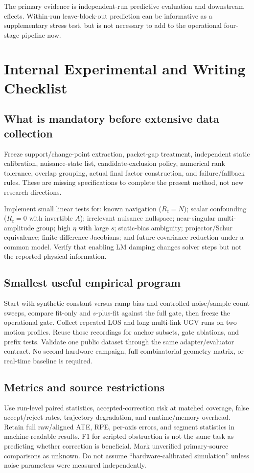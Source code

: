 \documentclass[conference]{IEEEtran}%
\begin{document}
The primary evidence is independent-run predictive evaluation and downstream effects. Within-run leave-block-out prediction can be informative as a supplementary stress test, but is not necessary to add to the operational four-stage pipeline now.

\section{Internal Experimental and Writing Checklist}
\subsection{What is mandatory before extensive data collection}
Freeze support/change-point extraction, packet-gap treatment, independent static calibration, nuisance-state list, candidate-exclusion policy, numerical rank tolerance, overlap grouping, actual final factor construction, and failure/fallback rules. These are missing specifications to complete the present method, not new research directions.

Implement small linear tests for: known navigation ($R_c=N$); scalar confounding ($R_c=0$ with invertible $A$); irrelevant nuisance nullspace; near-singular multi-amplitude group; high $\eta$ with large $s$; static-bias ambiguity; projector/Schur equivalence; finite-difference Jacobians; and future covariance reduction under a common model. Verify that enabling LM damping changes solver steps but not the reported physical information.

\subsection{Smallest useful empirical program}
Start with synthetic constant versus ramp bias and controlled noise/sample-count sweeps, compare fit-only and $s$-plus-fit against the full gate, then freeze the operational gate. Collect repeated LOS and long multi-link UGV runs on two motion profiles. Reuse those recordings for anchor subsets, gate ablations, and prefix tests. Validate one public dataset through the same adapter/evaluator contract. No second hardware campaign, full combinatorial geometry matrix, or real-time baseline is required.

\subsection{Metrics and source restrictions}
Use run-level paired statistics, accepted-correction risk at matched coverage, false accept/reject rates, trajectory degradation, and runtime/memory overhead. Retain full raw/aligned ATE, RPE, per-axis errors, and segment statistics in machine-readable results. F1 for scripted obstruction is not the same task as predicting whether correction is beneficial. Mark unverified primary-source comparisons as unknown. Do not assume ``hardware-calibrated simulation'' unless noise parameters were measured independently.
\end{document}
